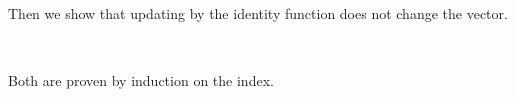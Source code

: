 Then we show that updating by the identity function does not change the vector.
\begin{code}%
\>[0]\AgdaSpace{}%
\AgdaSymbol{:}\AgdaSpace{}%
\AgdaSpace{}%
\AgdaSymbol{\{}\AgdaSymbol{\}}\AgdaSpace{}%
\AgdaSymbol{\{}\AgdaSpace{}%
\AgdaSymbol{:}\AgdaSpace{}%
\AgdaSpace{}%
\AgdaSpace{}%
\AgdaSymbol{\}}\AgdaSpace{}%
\AgdaSymbol{\{}\AgdaSpace{}%
\AgdaSymbol{:}\AgdaSpace{}%
\AgdaSpace{}%
\AgdaSymbol{\}}\AgdaSpace{}%
\AgdaSpace{}%
\AgdaSpace{}%
\AgdaOperator{\AgdaFunction{[}}\AgdaSpace{}%
\AgdaSpace{}%
\AgdaOperator{\AgdaFunction{]\%=}}\AgdaSpace{}%
\AgdaSpace{}%
\AgdaSpace{}%
\<%
\end{code}
\begin{code}[hide]%
\>[0]\AgdaSpace{}%
\AgdaSymbol{\{}\AgdaSymbol{\}}\AgdaSpace{}%
\AgdaSymbol{\{}\AgdaSpace{}%
\AgdaSpace{}%
\AgdaSymbol{\}}\AgdaSpace{}%
\AgdaSymbol{\{}\AgdaSymbol{\}}%
\>[28]\AgdaSymbol{=}\AgdaSpace{}%
\<%
\\
\>[0]\AgdaSpace{}%
\AgdaSymbol{\{}\AgdaSymbol{\}}\AgdaSpace{}%
\AgdaSymbol{\{}\AgdaSpace{}%
\AgdaSpace{}%
\AgdaSymbol{\AgdaUnderscore{}\}}\AgdaSpace{}%
\AgdaSymbol{\{}\AgdaSpace{}%
\AgdaSymbol{\}}\AgdaSpace{}%
\AgdaSymbol{=}\AgdaSpace{}%
\AgdaSpace{}%
\AgdaSymbol{(}\AgdaSpace{}%
\AgdaSymbol{)}\AgdaSpace{}%
\<%
\end{code}
Both are proven by induction on the index.

